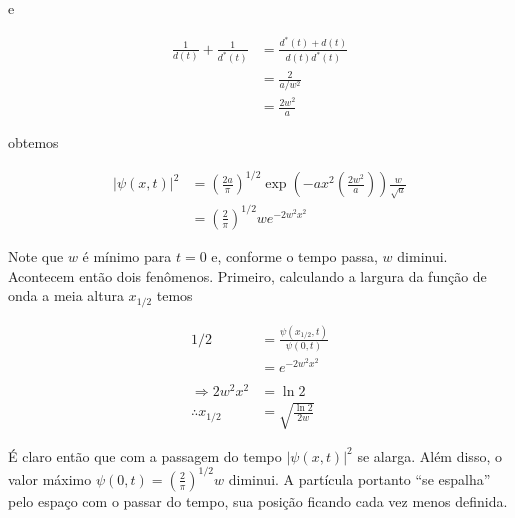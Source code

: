 \documentclass[a4paper, 12pt, notitlepage]{article}
\begin{document}
\begin{enumerate}
\begin{enumerate}
  e
  
  \begin{align*}
  \frac{1}{d(t)} + \frac{1}{d^{\ast}(t)} &= \frac{d^{\ast}(t) + d(t)}{d(t)d^{\ast}(t)} \\
  &= \frac{2}{a/w^2} \\
  &= \frac{2w^2}{a}
  \end{align*}
  
  obtemos
  
  \begin{align*}
  |\psi(x,t)|^2 &= \left(\frac{2a}{\pi}\right)^{1/2} \exp\left(-ax^2\left(\frac{2w^2}{a}\right)\right) \frac{w}{\sqrt{a}} \\
  &= \left(\frac{2}{\pi}\right)^{1/2} w e^{-2w^2x^2}
  \end{align*}
  
  Note que $w$ é mínimo para $t = 0$ e, conforme o tempo passa, $w$ diminui. Acontecem então dois fenômenos. Primeiro, calculando a largura da função de onda a meia altura $x_{1/2}$ temos
  
  \begin{align*}
  1/2 &= \frac{\psi(x_{1/2}, t)}{\psi(0, t)} \\
  &= e^{-2w^2 x^2} \\
  \\
  \Rightarrow 2w^2x^2 &= \ln 2 \\
  \therefore x_{1/2} &= \sqrt{\frac{\ln 2}{2 w}}
  \end{align*}
  
  É claro então que com a passagem do tempo $|\psi(x,t)|^2$ se alarga. Além disso, o valor máximo $\psi(0,t) = \left(\frac{2}{\pi}\right)^{1/2}w$ diminui. A partícula portanto ``se espalha'' pelo espaço com o passar do tempo, sua posição ficando cada vez menos definida.
  
  \def\FunctionW[#1]{sqrt(1 / (1 + 2 * 1 * #1)^2)}
  \def\FunctionPsi[#1](#2){0.79788 * \FunctionW[#1] * exp(-2 * (\FunctionW[#1])^2 * #2^2)}
  
  

\end{enumerate}
\end{enumerate}
\end{document}
